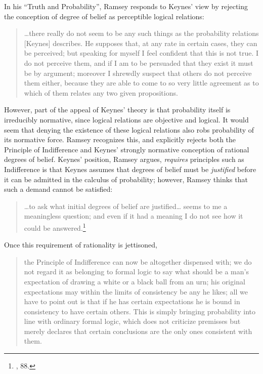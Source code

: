 In his ``Truth and Probability'', Ramsey responds to Keynes' view by
rejecting the conception of degree of belief as perceptible logical
relations:

\begin{quote}
\ldots{}there really do not seem to be any such things as the
probability relations {[}Keynes{]} describes. He supposes that, at any
rate in certain cases, they can be perceived; but speaking for myself I
feel confident that this is not true. I do not perceive them, and if I
am to be persuaded that they exist it must be by argument; moreover I
shrewdly suspect that others do not perceive them either, because they
are able to come to so very little agreement as to which of them relates
any two given propositions.
\end{quote}

However, part of the appeal of Keynes' theory is that probability itself
is irreducibly normative, since logical relations are objective and logical. It would seem that denying the existence of these logical relations also robs probability of its normative force. Ramsey recognizes this, and explicitly rejects both the Principle of Indifference and Keynes' strongly normative conception of rational degrees of belief. Keynes' position, Ramsey argues, \emph{requires} principles such as Indifference is that Keynes assumes that degrees of belief must be \emph{justified} before it can be admitted in the calculus of probability; however, Ramsey thinks that such a demand cannot be satisfied:

\begin{quote}
\ldots{}to ask what initial degrees of belief are justified\ldots{}
seems to me a meaningless question; and even if it had a meaning I do
not see how it could be answered.\footnote{\cite{ramsey}, 88.}
\end{quote}

Once this requirement of rationality is jettisoned,

\begin{quote}
the Principle of Indifference can now be altogether dispensed with; we
do not regard it as belonging to formal logic to say what should be a
man's expectation of drawing a white or a black ball from an urn; his
original expectations may within the limits of consistency be any he
likes; all we have to point out is that if he has certain expectations
he is bound in consistency to have certain others. This is simply
bringing probability into line with ordinary formal logic, which does
not criticize premisses but merely declares that certain conclusions are
the only ones consistent with them.
\end{quote}

